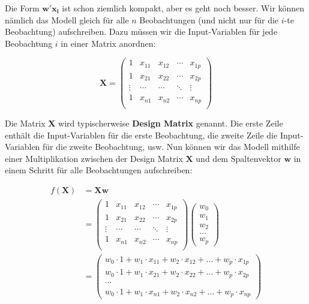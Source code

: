 \documentclass[
]{book}
\begin{document}
Die Form \(\mathbf{w}' \mathbf{x_i}\) ist schon ziemlich kompakt, aber es geht noch besser. Wir können nämlich das Modell gleich für alle \(n\) Beobachtungen (und nicht nur für die \(i\)-te Beobachtung) aufschreiben. Dazu müssen wir die Input-Variablen für jede Beobachtung \(i\) in einer Matrix anordnen:

\[
\mathbf{X} = \begin{pmatrix}
1 & x_{11} & x_{12} & \cdots & x_{1p}\\ 
1 & x_{21} & x_{22} & \cdots & x_{2p}\\
\vdots & \cdots & \cdots & \ddots & \vdots\\
1 & x_{n1} & x_{n2} & \cdots & x_{np}\\
\end{pmatrix}
\]

Die Matrix \(\mathbf{X}\) wird typischerweise \textbf{Design Matrix} genannt. Die erste Zeile enthält die Input-Variablen für die erste Beobachtung, die zweite Zeile die Input-Variablen für die zweite Beobachtung, usw. Nun können wir das Modell mithilfe einer Multiplikation zwischen der Design Matrix \(\mathbf{X}\) und dem Spaltenvektor \(\mathbf{w}\) in einem Schritt für alle Beobachtungen aufschreiben:

\begin{align}
f(\mathbf{X}) &= \mathbf{X}\mathbf{w}\\
&= \begin{pmatrix}
1 & x_{11} & x_{12} & \cdots & x_{1p}\\ 
1 & x_{21} & x_{22} & \cdots & x_{2p}\\
\vdots & \cdots & \cdots & \ddots & \vdots\\
1 & x_{n1} & x_{n2} & \cdots & x_{np}\\
\end{pmatrix}\begin{pmatrix} w_0 \\ w_1 \\ w_2 \\ \dots \\ w_p \end{pmatrix}\\
&= \begin{pmatrix} 
w_0 \cdot 1 + w_1 \cdot x_{11} + w_2 \cdot x_{12} + \dots + w_p \cdot x_{1p} \\
w_0 \cdot 1 + w_1 \cdot x_{21} + w_2 \cdot x_{22} + \dots + w_p \cdot x_{2p} \\ 
\cdots \\ 
w_0 \cdot 1 + w_1 \cdot x_{n1} + w_2 \cdot x_{n2} + \dots + w_p \cdot x_{np}\end{pmatrix}
\end{align}
\end{document}
